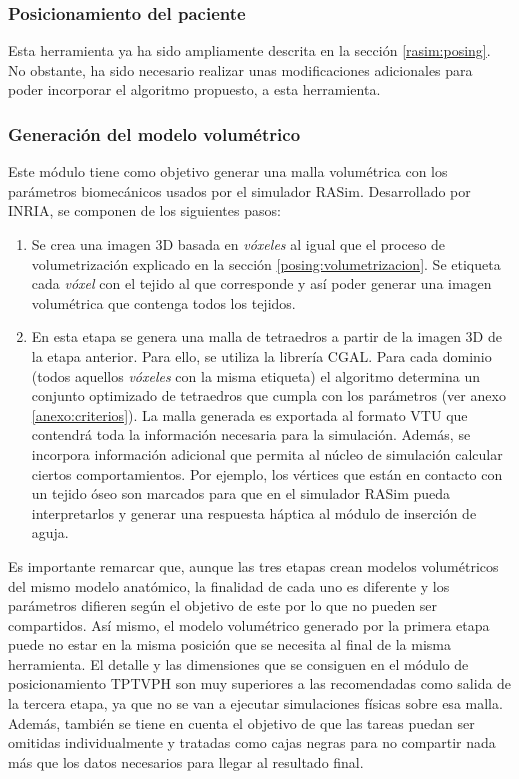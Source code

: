\subsubsection{Posicionamiento del paciente}
Esta herramienta ya ha sido ampliamente descrita en la sección \ref{rasim:posing}. 
No obstante, ha sido necesario realizar unas modificaciones adicionales para poder incorporar el algoritmo propuesto, a esta herramienta.


\subsubsection{Generación del modelo volumétrico}

Este módulo tiene como objetivo generar una malla volumétrica con los parámetros biomecánicos usados por el simulador \ac{RASim}. Desarrollado por \ac{INRIA}, se componen de los siguientes pasos:
\begin{enumerate}
    \item Se crea una imagen 3D basada en \emph{vóxeles} al igual que el proceso de volumetrización explicado en la sección \ref{posing:volumetrizacion}. Se etiqueta cada \emph{vóxel} con el tejido al que corresponde y así poder generar una imagen volumétrica que contenga todos los tejidos.
\item En esta etapa se genera una malla de tetraedros a partir de la imagen 3D de la etapa anterior. Para ello, se utiliza la librería \ac{CGAL}.
Para cada dominio (todos aquellos \emph{vóxeles} con la misma etiqueta) el algoritmo determina un conjunto optimizado de tetraedros que cumpla con los parámetros (ver anexo \ref{anexo:criterios}).  
La malla generada es exportada al formato \ac{VTU} que contendrá toda la información necesaria para la simulación.
Además, se incorpora información adicional que permita al núcleo de simulación calcular ciertos comportamientos. Por ejemplo, los vértices que están en contacto con un tejido óseo son marcados para que en el simulador \ac{RASim} pueda interpretarlos y generar una respuesta háptica al módulo de inserción de aguja.

\end{enumerate}

Es importante remarcar que, aunque las tres etapas crean modelos volumétricos del mismo modelo anatómico, la finalidad de cada uno es diferente y los parámetros difieren según el objetivo de este por lo que no pueden ser compartidos. Así mismo, el modelo volumétrico generado por la primera etapa puede no estar en la misma posición que se necesita al final de la misma herramienta. El detalle y las dimensiones que se consiguen en el módulo de posicionamiento \ac{TPTVPH} son muy superiores a las recomendadas como salida de la tercera etapa, ya que no se van a ejecutar simulaciones físicas sobre esa malla. Además, también se tiene en cuenta el objetivo de que las tareas puedan ser omitidas individualmente y tratadas como cajas negras para no compartir nada más que los datos necesarios para llegar al resultado final.




